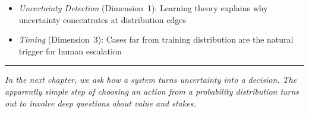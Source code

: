 \begin{itemize}
    \item \textit{Uncertainty Detection} (Dimension~1): Learning theory explains why uncertainty concentrates at distribution edges
    \item \textit{Timing} (Dimension~3): Cases far from training distribution are the natural trigger for human escalation
\end{itemize}

\bigskip
\begin{center}
\rule{0.5\textwidth}{0.4pt}
\end{center}
\bigskip

\noindent\textit{In the next chapter, we ask how a system turns uncertainty into a decision. The apparently simple step of choosing an action from a probability distribution turns out to involve deep questions about value and stakes.}
